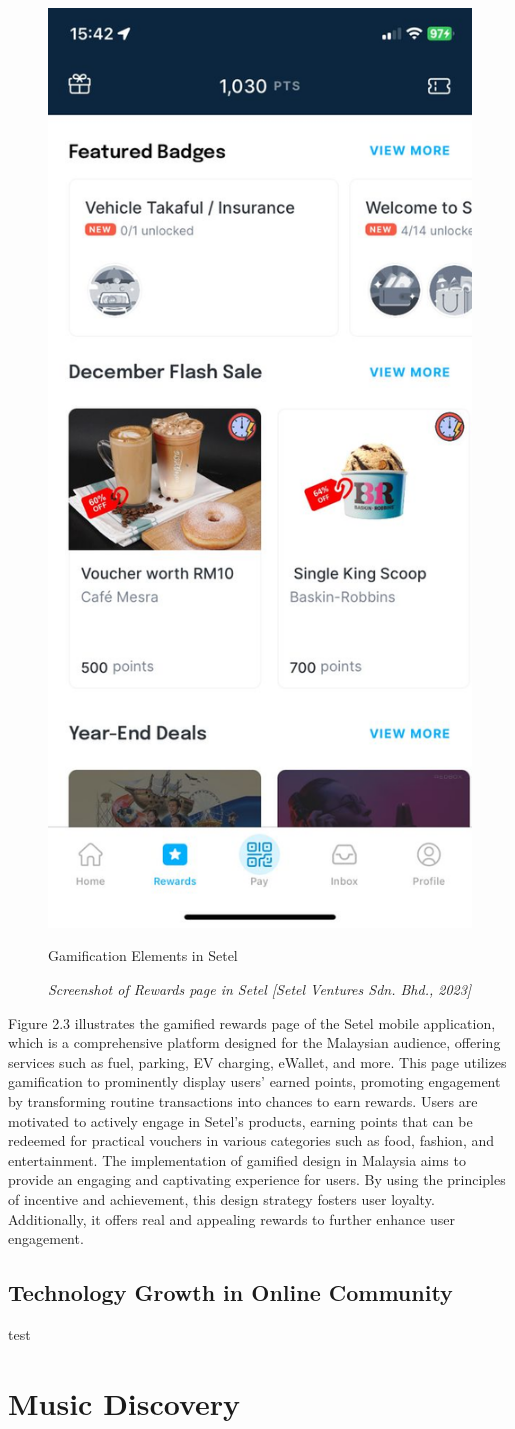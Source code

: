 \begin{figure}[h]
    \centering
    \includegraphics[width=0.35\linewidth]{mainmatter/images/gami1.jpg}
    \caption{Gamification Elements in Setel}
    \caption*{\textit{Screenshot of Rewards page in Setel [Setel Ventures Sdn. Bhd., 2023]}}
    \label{fig:myfig5}
\end{figure}
Figure 2.3 illustrates the gamified rewards page of the Setel mobile application, which is a comprehensive platform designed for the Malaysian audience, offering services such as fuel, parking, EV charging, eWallet, and more. This page utilizes gamification to prominently display users' earned points, promoting engagement by transforming routine transactions into chances to earn rewards. Users are motivated to actively engage in Setel's products, earning points that can be redeemed for practical vouchers in various categories such as food, fashion, and entertainment. The implementation of gamified design in Malaysia aims to provide an engaging and captivating experience for users. By using the principles of incentive and achievement, this design strategy fosters user loyalty. Additionally, it offers real and appealing rewards to further enhance user engagement.

\subsection{Technology Growth in Online Community}
test

\section{Music Discovery}
